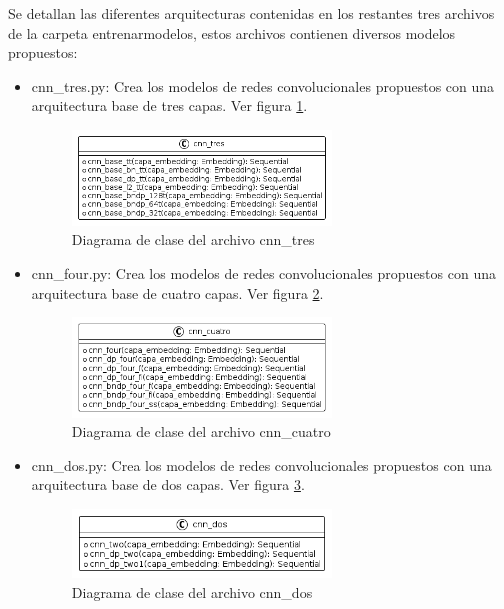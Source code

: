 Se detallan las diferentes arquitecturas contenidas en los restantes tres archivos de la carpeta entrenarmodelos, estos archivos contienen diversos modelos propuestos:

\begin{itemize}

\item cnn\_tres.py: Crea los modelos de redes convolucionales propuestos con una arquitectura base de tres capas. Ver figura \ref{fig:uml9}.

\begin{figure}
	\includegraphics[width=0.65\textwidth]{capitulo5/figuras/fig9.png}
	\caption{Diagrama de clase del archivo cnn\_tres}
	\label{fig:uml9}
\end{figure}

\item cnn\_four.py: Crea los modelos de redes convolucionales propuestos con una arquitectura base de cuatro capas. Ver figura \ref{fig:uml10}.

\begin{figure}
	\includegraphics[width=0.65\textwidth]{capitulo5/figuras/fig10.png}
	\caption{Diagrama de clase del archivo cnn\_cuatro}
	\label{fig:uml10}
\end{figure}

\item cnn\_dos.py: Crea los modelos de redes convolucionales propuestos con una arquitectura base de dos capas. Ver figura \ref{fig:uml11}.

\begin{figure}
	\includegraphics[width=0.65\textwidth]{capitulo5/figuras/fig11.png}
	\caption{Diagrama de clase del archivo cnn\_dos}
	\label{fig:uml11}
\end{figure}

\end{itemize}

